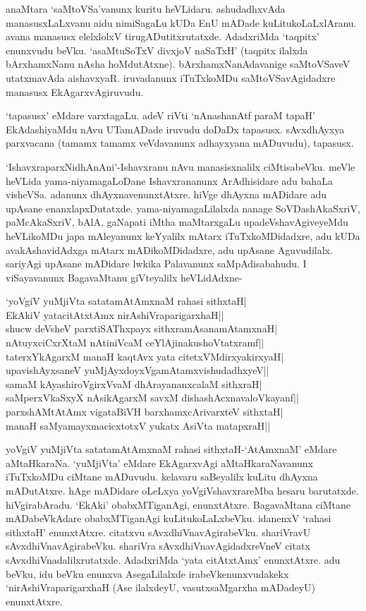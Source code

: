 anaMtara `saMtoVSa'vanunx kuritu heVLidaru. ashudadhxvAda manasusxLaLxvanu aidu nimiSagaLu kUDa EnU mADade kuLitukoLaLxlAranu. avana manasusx elelxlolxV tirugADutitxrutatxde. AdadxriMda `taqpitx' enunxvudu beVku. `asaMtuSoTxV divxjoV naSaTxH' (taqpitx ilalxda bArxhamxNanu nAsha hoMdutAtxne). bArxhamxNanAdavanige saMtoVSaveV utatxmavAda aishavxyaR. iruvadanunx iTuTxkoMDu saMtoVSavAgidadxre manasusx EkAgarxvAgiruvudu.

`tapasusx' eMdare varxtagaLu. adeV riVti `nAnashanAtf paraM tapaH' EkAdashiyaMdu nAvu UTamADade iruvudu doDaDx tapasusx. sAvxdhAyxya parxvacana (tamamx tamamx veVdavanunx adhayxyana mADuvudu), tapasusx.

`IshavxraparxNidhAnAni'-Ishavxranu nAvu manasisxnalilx ciMtisabeVku. meVle heVLida yama-niyamagaLoDane Ishavxrananunx ArAdhisidare adu bahaLa visheVSa. adanunx dhAyxnavenunxtAtxre. hiVge dhAyxna mADidare adu upAsane enanxlapxDutatxde. yama-niyamagaLilalxda nanage SoVDashAkaSxriV, paMcAkaSxriV, bAlA, gaNapati iMtha maMtarxgaLu upadeVshavAgiveyeMdu heVLikoMDu japa mAleyanunx keYyalilx mAtarx iTuTxkoMDidadxre, adu kUDa avakAshavidAdxga mAtarx mADikoMDidadxre, adu upAsane Aguvudilalx. sariyAgi upAsane mADidare lwkika Palavanunx saMpAdisabahudu. I viSayavanunx BagavaMtanu giVteyalilx heVLidAdxne-

\begin{shloka}
`yoVgiV yuMjiVta satatamAtAmxnaM rahasi sithxtaH|\\
EkAkiV yatacitAtxtAmx nirAshiVraparigarxhaH||\\
shucw deVsheV parxtiSAThxpayx sithxramAsanamAtamxnaH|\\
nAtuyxciCxrXtaM nAtiniVcaM ceYlAjinakushoVtatxramf||\\
taterxYkAgarxM manaH kaqtAvx yata citetxVMdirxyakirxyaH|\\
upavishAyxsaneV yuMjAyxdoyxVgamAtamxvishudadhxyeV||\\
samaM kAyashiroVgirxVvaM dhArayananxcalaM sithxraH|\\
saMperxVkaSxyX nAsikAgarxM savxM dishashAcxnavaloVkayanf||\\
parxshAMtAtAmx vigataBiVH barxhamxcArivarxteV sithxtaH|\\
manaH saMyamayxmacicxtotxV yukatx AsiVta matapxraH||
\end{shloka}

yoVgiV yuMjiVta satatamAtAmxnaM rahasi sithxtaH-`AtAmxnaM' eMdare aMtaHkaraNa. `yuMjiVta' eMdare EkAgarxvAgi aMtaHkaraNavanunx iTuTxkoMDu ciMtane mADuvudu. kelavaru saBeyalilx kuLitu dhAyxna mADutAtxre. hAge mADidare oLeLxya yoVgiVshavxrareMba hesaru barutatxde. hiVgirabAradu. `EkAki' obabxMTiganAgi, enunxtAtxre. BagavaMtana ciMtane mADabeVkAdare obabxMTiganAgi kuLitukoLaLxbeVku. idanenxV `rahasi sithxtaH' enunxtAtxre. citatxvu sAvxdhiVnavAgirabeVku. shariVravU sAvxdhiVnavAgirabeVku. shariVra sAvxdhiVnavAgidadxreVneV citatx sAvxdhiVnadalilxrutatxde. AdadxriMda `yata citAtxtAmx' enunxtAtxre. adu beVku, idu beVku enunxva AsegaLilalxde irabeVkenunxvudakekx `nirAshiVraparigarxhaH (Ase ilalxdeyU, vasutxsaMgarxha mADadeyU) enunxtAtxre.

